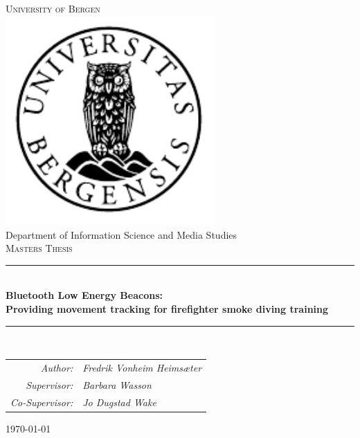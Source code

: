 \documentclass[../Main/thesis.tex]{subfiles}
\begin{document}

\newcommand{\HRule}{\rule{\linewidth}{0.5mm}}

\begin{titlepage}
\begin{center}
\textsc{\Huge University of Bergen}\\[0.4cm]
\includegraphics[width=8cm]{../fig/uib} \\[0.5cm]

\large Department of Information Science and Media Studies\\[0.7cm]
\textsc{\huge Masters Thesis}\\[0.4cm]
\HRule \\[0.4cm]
{ \huge \bfseries Bluetooth Low Energy Beacons: \\Providing movement tracking for firefighter smoke diving training}\\[0.5cm]
\HRule \\[1.0cm]

\renewcommand{\arraystretch}{1}
\begin{tabular}{rl}
\textit{Author:}        & \textit{Fredrik Vonheim Heimsæter} \\
\textit{Supervisor:}    & \textit{Barbara Wasson}            \\
\textit{Co-Supervisor:} & \textit{Jo Dugstad Wake}
\end{tabular}

\renewcommand{\arraystretch}{1.5}
\end{center}
\vfill
\begin{center}
{\large \today}
\end{center}
\end{titlepage}
\end{document}
